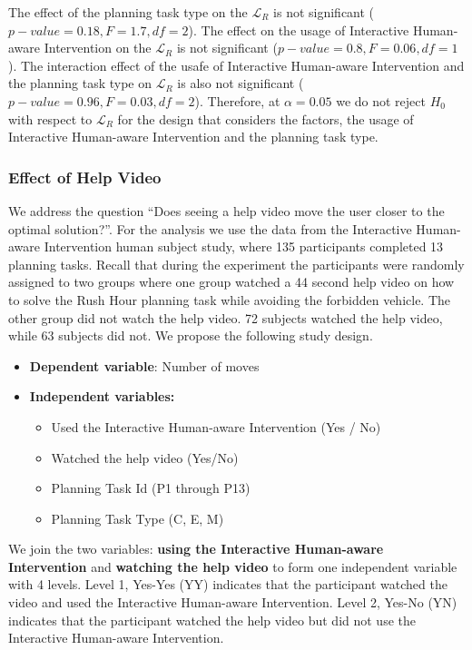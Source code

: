 The effect of the planning task type on the $\mathcal{L}_R$ is not significant ($p-value=0.18, F=1.7, df=2$).
The effect on the usage of Interactive Human-aware Intervention on the $\mathcal{L}_R$ is not significant ($p-value=0.8, F=0.06, df=1$).
The interaction effect of the usafe of Interactive Human-aware Intervention and the planning task type on $\mathcal{L}_R$ is also not significant ($p-value=0.96, F=0.03, df=2$).
Therefore, at $\alpha=0.05$ we do not reject $H_0$ with respect to $\mathcal{L}_R$ for the design that considers the factors, the usage of Interactive Human-aware Intervention and the planning task type.

\subsubsection{Effect of Help Video}
We address the question ``Does seeing a help video move the user closer to the optimal solution?''.
For the analysis we use the data from the Interactive Human-aware Intervention  human subject study, where 135 participants completed 13 planning tasks.
Recall that during the experiment the participants were randomly assigned to two groups where one group watched a 44 second help video on how to solve the Rush Hour planning task while avoiding the forbidden vehicle.
The other group did not watch the help video.
72 subjects watched the help video, while 63 subjects did not.
We propose the following study design.
\begin{itemize}
\item \textbf{Dependent variable}: Number of moves
\item \textbf{Independent variables:}
\begin{itemize}
\item Used the Interactive Human-aware Intervention (Yes / No)
\item Watched the help video (Yes/No)
\item Planning Task Id (P1 through P13)
\item Planning Task Type (C, E, M)
\end{itemize}
\end{itemize}
We join the two variables: \textbf{using the Interactive Human-aware Intervention} and \textbf{watching the help video} to form one independent variable with 4 levels.
Level 1, Yes-Yes (YY) indicates that the participant watched the video and used the Interactive Human-aware Intervention.
Level 2, Yes-No (YN) indicates that the participant watched the help video but did not use the Interactive Human-aware Intervention.
